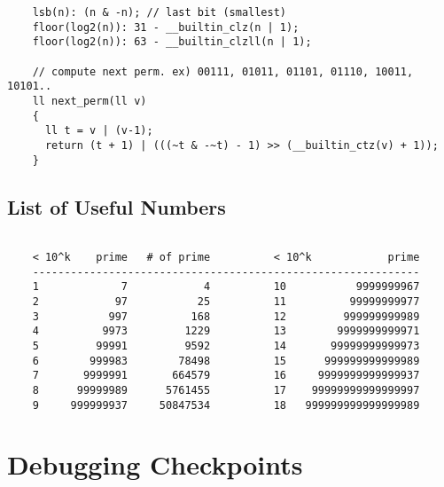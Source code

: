 \documentclass[landscape,8pt]{article}
\begin{document}
\begin{multicols}{2}
\begin{verbatim}
    lsb(n): (n & -n); // last bit (smallest)
    floor(log2(n)): 31 - __builtin_clz(n | 1);
    floor(log2(n)): 63 - __builtin_clzll(n | 1);

    // compute next perm. ex) 00111, 01011, 01101, 01110, 10011, 10101..
    ll next_perm(ll v)
    {
      ll t = v | (v-1);
      return (t + 1) | (((~t & -~t) - 1) >> (__builtin_ctz(v) + 1));
    }
  \end{verbatim}
  \columnbreak
  \subsection{List of Useful Numbers}
  \begin{verbatim}

    < 10^k    prime   # of prime          < 10^k            prime
    -------------------------------------------------------------
    1             7            4          10           9999999967
    2            97           25          11          99999999977
    3           997          168          12         999999999989
    4          9973         1229          13        9999999999971
    5         99991         9592          14       99999999999973
    6        999983        78498          15      999999999999989
    7       9999991       664579          16     9999999999999937
    8      99999989      5761455          17    99999999999999997
    9     999999937     50847534          18   999999999999999989
  \end{verbatim}
\columnbreak


\section{Debugging Checkpoints}
\end{multicols}
\end{document}
